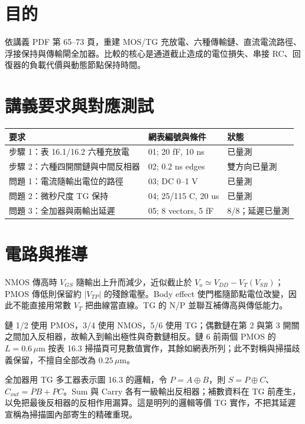 \section{目的}

依講義 PDF 第 65--73 頁，重建 MOS/TG 充放電、六種傳輸鏈、直流電流路徑、浮接保持與傳輸閘全加器。比較的核心是通道截止造成的電位損失、串接 RC、回復器的負載代價與動態節點保持時間。

\section{講義要求與對應測試}

\begin{center}
\small
\setlength{\tabcolsep}{4pt}
\begin{tabular}{p{.42\linewidth}p{.29\linewidth}p{.18\linewidth}}
\toprule
要求 & 網表編號與條件 & 狀態 \\
\midrule
步驟 1：表 16.1/16.2 六種充放電 & 01; 20 fF, 10 ns & 已量測 \\
步驟 2：六種四開關鏈與中間反相器 & 02; 0.2 ns edges & 雙方向已量測 \\
問題 1：電流隨輸出電位的路徑 & 03; DC 0--1 V & 已量測 \\
問題 2：微秒尺度 TG 保持 & 04; 25/115 C, 20 us & 已量測 \\
問題 3：全加器與兩輸出延遲 & 05; 8 vectors, 5 fF & 8/8；延遲已量測 \\
\bottomrule
\end{tabular}
\end{center}

\section{電路與推導}

NMOS 傳高時 $V_{GS}$ 隨輸出上升而減少，近似截止於 $V_o\simeq V_{DD}-V_T(V_{SB})$；PMOS 傳低則保留約 $|V_{TP}|$ 的殘餘電壓。Body effect 使門檻隨節點電位改變，因此不能直接用常數 $V_T$ 把曲線當直線。TG 的 N/P 並聯互補傳高與傳低能力。

鏈 1/2 使用 PMOS，3/4 使用 NMOS，5/6 使用 TG；偶數鏈在第 2 與第 3 開關之間加入反相器，故輸入到輸出極性與奇數鏈相反。鏈 6 前兩個 PMOS 的 $L=0.6\,\mu$m 按表 16.3 掃描頁可見數值實作，其餘如網表所列；此不對稱與掃描歧義保留，不擅自全部改為 $0.25\,\mu$m。

全加器用 TG 多工器表示圖 16.3 的邏輯，令 $P=A\oplus B$，則 $S=P\oplus C$、$C_{out}=\overline P B+PC$。Sum 與 Carry 各有一級輸出反相器；補數資料在 TG 前產生，以免把最後反相器的反相作用漏算。這是明列的邏輯等價 TG 實作，不把其延遲宣稱為掃描圖內部寄生的精確重現。

